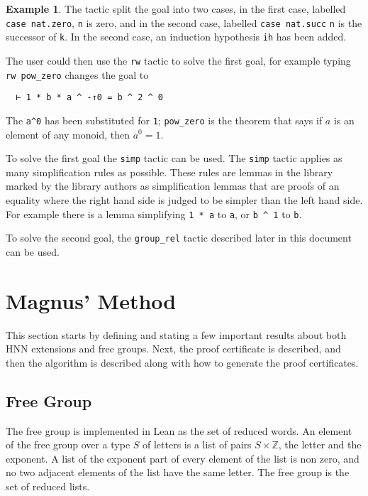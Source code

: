 \documentclass[11pt]{article} %
\theoremstyle{definition}
\theoremstyle{definition}
\theoremstyle{definition}
\theoremstyle{definition}
\theoremstyle{definition}
\theoremstyle{definition}
\newtheorem{exmpl}{Example}[theorem]
\begin{document}
\begin{exmpl}
The tactic split the goal into two cases, in the first case, labelled \lstinline{case nat.zero},
\lstinline{n} is zero, and in the second case, labelled \lstinline{case nat.succ}
\lstinline{n} is the successor of \lstinline{k}. In the second case, an induction
hypothesis \lstinline{ih} has been added.

The user could then use the \lstinline{rw} tactic to solve the first goal,
for example typing \lstinline{rw pow_zero} changes the goal to
\begin{lstlisting}
  ⊢ 1 * b * a ^ -↑0 = b ^ 2 ^ 0
\end{lstlisting}

The \lstinline{a^0} has been substituted
for \lstinline{1}; \lstinline{pow_zero} is the theorem that says if $a$ is an
element of any monoid, then $a^0= 1$.

To solve the first goal the \lstinline{simp} tactic can be used.
The \lstinline{simp} tactic applies as many simplification rules as possible.
These rules are lemmas in the library marked by the library authors as simplification
lemmas that are proofs of an equality where the right hand side is judged to be simpler
than the left hand side. For example there is a lemma simplifying \lstinline{1 * a} to
\lstinline{a}, or \lstinline{b ^ 1} to \lstinline{b}.

To solve the second goal, the \lstinline{group_rel} tactic described later in this document can be used.

\end{exmpl}

\section{Magnus' Method}

This section starts by defining and stating a few important results about both
HNN extensions and free groups. Next, the proof certificate is described, and then
the algorithm is described along with how to generate the proof certificates.

\subsection{Free Group}

The free group is implemented in Lean as the set of reduced words. An element of
the free group over a type $S$ of letters is a list of pairs $S \times \mathbb{Z}$,
the letter and the exponent.
A list of the exponent part of every element of the list is non zero, and
no two adjacent elements of the list have the same letter. The free group is the set of
reduced lists.
\end{document}
